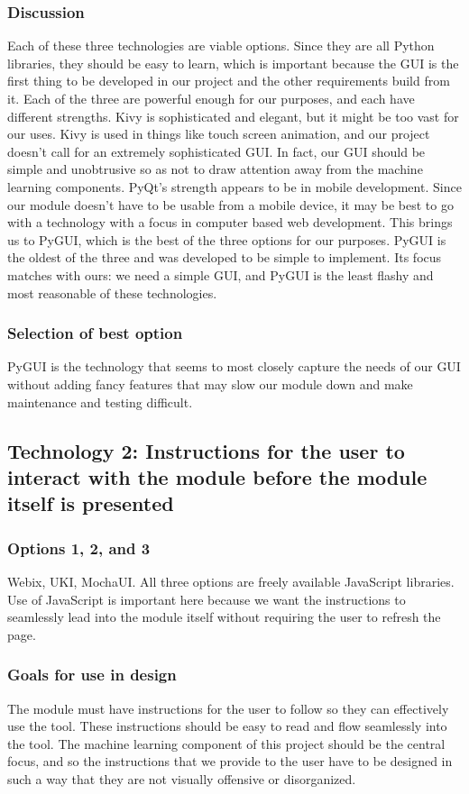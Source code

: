 \documentclass[journal,onecolumn]{IEEEtran}
\begin{document}
\subsubsection{Discussion}
Each of these three technologies are viable options. Since they are all Python libraries, they should be easy to learn, which is important because the GUI is the first thing to be developed in our project and the other requirements build from it. Each of the three are powerful enough for our purposes, and each have different strengths. Kivy is sophisticated and elegant, but it might be too vast for our uses. Kivy is used in things like touch screen animation, and our project doesn't call for an extremely sophisticated GUI. In fact, our GUI should be simple and unobtrusive so as not to draw attention away from the machine learning components. PyQt's strength appears to be in mobile development. Since our module doesn't have to be usable from a mobile device, it may be best to go with a technology with a focus in computer based web development. This brings us to PyGUI, which is the best of the three options for our purposes. PyGUI is the oldest of the three and was developed to be simple to implement. Its focus matches with ours: we need a simple GUI, and PyGUI is the least flashy and most reasonable of these technologies.
\subsubsection{Selection of best option}
PyGUI is the technology that seems to most closely capture the needs of our GUI without adding fancy features that may slow our module down and make maintenance and testing difficult.


\subsection{Technology 2: Instructions for the user to interact with the module before the module itself is presented}

\subsubsection{Options 1, 2, and 3}
Webix, UKI, MochaUI. All three options are freely available JavaScript libraries. Use of JavaScript is important here because we want the instructions to seamlessly lead into the module itself without requiring the user to refresh the page.
\subsubsection{Goals for use in design}
The module must have instructions for the user to follow so they can effectively use the tool. These instructions should be easy to read and flow seamlessly into the tool. The machine learning component of this project should be the central focus, and so the instructions that we provide to the user have to be designed in such a way that they are not visually offensive or disorganized.
\end{document}
